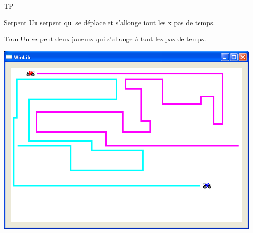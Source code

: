\begin{frame}{TP}

    \begin{minipage}{0.47\linewidth}
        \begin{block}{Serpent}
            Un serpent qui se déplace et s'allonge tout les x pas de temps.
        \end{block}
            \begin{block}{Tron}
                Un serpent deux joueurs qui s'allonge à tout les pas de temps.
            \end{block}

    \end{minipage}
    \hfill
    \begin{minipage}{0.47\linewidth}
        \includegraphics[width=\linewidth]{images/tp.png}
    \end{minipage}
\end{frame}



